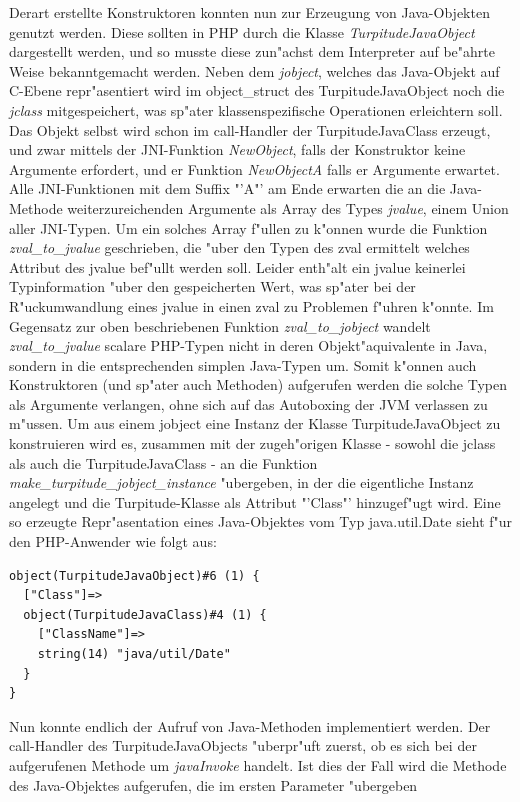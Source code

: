 Derart erstellte Konstruktoren konnten nun zur Erzeugung von Java-Objekten genutzt werden. Diese sollten in PHP durch die Klasse
\emph{TurpitudeJavaObject} dargestellt werden, und so musste diese zun"achst dem Interpreter auf be"ahrte Weise bekanntgemacht werden.
Neben dem \emph{jobject}, welches das Java-Objekt auf C-Ebene repr"asentiert wird im object\_struct des TurpitudeJavaObject noch die \emph{jclass}
mitgespeichert, was sp"ater klassenspezifische Operationen erleichtern soll. Das Objekt selbst wird schon im call-Handler der TurpitudeJavaClass 
erzeugt, und zwar mittels der JNI-Funktion \emph{NewObject}, falls der Konstruktor keine Argumente erfordert, und er Funktion \emph{NewObjectA} falls
er Argumente erwartet. Alle JNI-Funktionen mit dem Suffix "'A"' am Ende erwarten die an die Java-Methode weiterzureichenden Argumente als Array
des Types \emph{jvalue}, einem Union aller JNI-Typen. Um ein solches Array f"ullen zu k"onnen wurde die Funktion \emph{zval\_to\_jvalue} geschrieben,
die "uber den Typen des zval ermittelt welches Attribut des jvalue bef"ullt werden soll. Leider enth"alt ein jvalue keinerlei Typinformation "uber den
gespeicherten Wert, was sp"ater bei der R"uckumwandlung eines jvalue in einen zval zu Problemen f"uhren k"onnte. Im Gegensatz zur oben beschriebenen 
Funktion \emph{zval\_to\_jobject} wandelt \emph{zval\_to\_jvalue} scalare PHP-Typen nicht in deren Objekt"aquivalente in Java, sondern in die
entsprechenden simplen Java-Typen um. Somit k"onnen auch Konstruktoren (und sp"ater auch Methoden) aufgerufen werden die solche Typen als Argumente
verlangen, ohne sich auf das Autoboxing der JVM verlassen zu m"ussen.
Um aus einem jobject eine Instanz der Klasse
TurpitudeJavaObject zu konstruieren wird es, zusammen mit der zugeh"origen Klasse - sowohl die jclass als auch die TurpitudeJavaClass - an die Funktion 
\emph{make\_turpitude\_jobject\_instance} "ubergeben, in der die eigentliche Instanz angelegt und die Turpitude-Klasse als Attribut "'Class"' hinzugef"ugt wird. 
Eine so erzeugte Repr"asentation eines Java-Objektes vom Typ java.util.Date sieht f"ur den PHP-Anwender wie folgt aus:
\begin{lstlisting}[caption=Dump eines TurpitudeJavaObject]
object(TurpitudeJavaObject)#6 (1) {
  ["Class"]=>
  object(TurpitudeJavaClass)#4 (1) {
    ["ClassName"]=>
    string(14) "java/util/Date"
  }
}
\end{lstlisting}
Nun konnte endlich der Aufruf von Java-Methoden implementiert werden. Der call-Handler des TurpitudeJavaObjects "uberpr"uft zuerst, ob es sich bei der
aufgerufenen Methode um \emph{javaInvoke} handelt. Ist dies der Fall wird die Methode des Java-Objektes aufgerufen, die im ersten Parameter "ubergeben 
